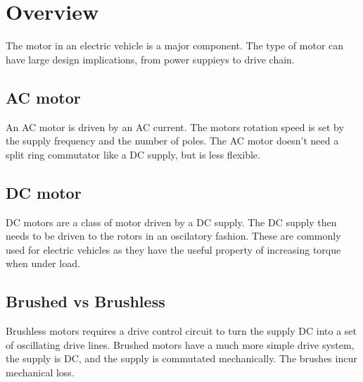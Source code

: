 \documentclass{article}
\begin{document}
\section{Overview}
The motor in an electric vehicle is a major component.
The type of motor can have large design implications, from power suppieys to drive chain.
\subsection{AC motor}
An AC motor is driven by an AC current.
The motors rotation speed is set by the supply frequency and the number of poles.
The AC motor doesn't need a split ring commutator like a DC supply, but is less flexible.

\subsection{DC motor}
DC motors are a class of motor driven by a DC supply.
The DC supply then needs to be driven to the rotors in an oscilatory fashion. 
These are commonly used for electric vehicles as they have the useful property of increasing torque when under load. 
\subsection{Brushed vs Brushless}
Brushless motors requires a drive control circuit to turn the supply DC into a set of oscillating drive lines.
Brushed motors have a much more simple drive system, the supply is DC, and the supply is commutated mechanically.
The brushes incur mechanical loss.
\end{document}
